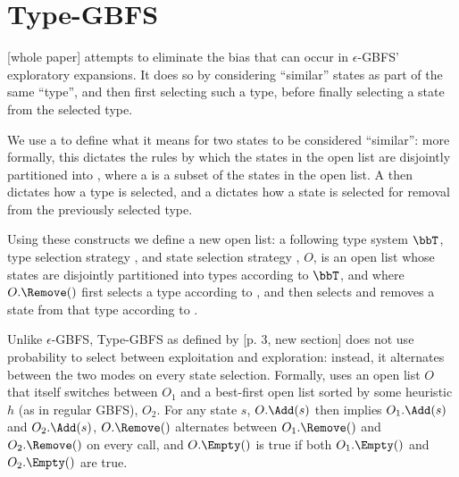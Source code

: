 
\section{Type-GBFS}

 [whole paper] attempts to eliminate the bias that can occur in $\epsilon$-GBFS' exploratory expansions. It does so by considering ``similar'' states as part of the same ``type'', and then first selecting such a type, before finally selecting a state from the selected type.

We use a  to define what it means for two states to be considered ``similar'': more formally, this dictates the rules by which the states in the open list are disjointly partitioned into , where a  is a subset of the states in the open list. A  then dictates how a type is selected, and a  dictates how a state is selected for removal from the previously selected type.

Using these constructs we define a new open list: a  following type system $\bbT$, type selection strategy , and state selection strategy , $O$, is an open list whose states are disjointly partitioned into types according to $\bbT$, and where $O.\Remove()$ first selects a type according to , and then selects and removes a state from that type according to .

Unlike $\epsilon$-GBFS, Type-GBFS as defined by [p. 3, new section] does not use probability to select between exploitation and exploration: instead, it alternates between the two modes on every state selection. Formally,  uses an open list $O$ that itself switches between $O_1$ and a best-first open list sorted by some heuristic $h$ (as in regular GBFS), $O_2$. For any state $s$, $O.\Add(s)$ then implies $O_1.\Add(s)$ and $O_2.\Add(s)$, $O.\Remove()$ alternates between $O_1.\Remove()$ and $O_2.\Remove()$ on every call, and $O.\Empty()$ is true if both $O_1.\Empty()$ and $O_2.\Empty()$ are true.


